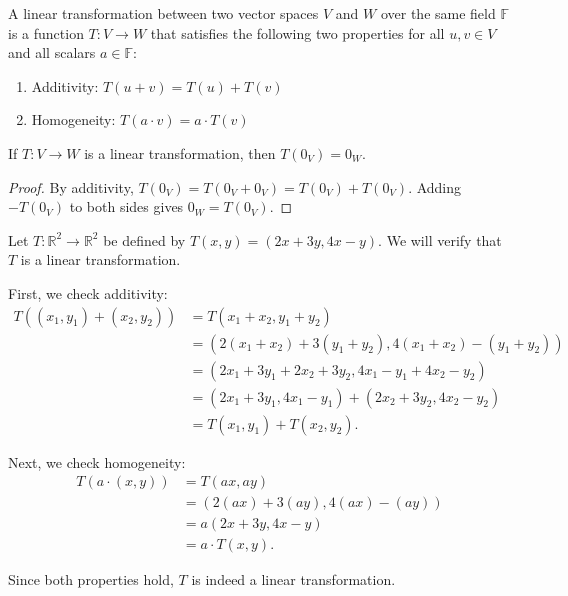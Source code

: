 \begin{definition}
    A linear transformation between two vector spaces $V$ and $W$ over the same field $\mathbb{F}$ is a function $T: V \to W$ that satisfies the following two properties for all $u, v \in V$ and all scalars $a \in \mathbb{F}$:
    \begin{enumerate}
        \item Additivity: $T(u + v) = T(u) + T(v)$
        \item Homogeneity: $T(a \cdot v) = a \cdot T(v)$
    \end{enumerate}
\end{definition}

\begin{lemma}\label{L1-lem:zero}
    If $T: V \to W$ is a linear transformation, then $T(0_V) = 0_W$.
\end{lemma}

\begin{proof}
    By additivity, $T(0_V) = T(0_V + 0_V) = T(0_V) + T(0_V)$. Adding $-T(0_V)$ to both sides gives $0_W = T(0_V)$.
\end{proof}

\begin{example}
    Let $T: \mathbb{R}^2 \to \mathbb{R}^2$ be defined by $T(x, y) = (2x + 3y, 4x - y)$. We will verify that $T$ is a linear transformation.

    First, we check additivity:
    \begin{align*}
        T((x_1, y_1) + (x_2, y_2)) &= T(x_1 + x_2, y_1 + y_2) \\
        &= (2(x_1 + x_2) + 3(y_1 + y_2), 4(x_1 + x_2) - (y_1 + y_2)) \\
        &= (2x_1 + 3y_1 + 2x_2 + 3y_2, 4x_1 - y_1 + 4x_2 - y_2) \\
        &= (2x_1 + 3y_1, 4x_1 - y_1) + (2x_2 + 3y_2, 4x_2 - y_2) \\
        &= T(x_1, y_1) + T(x_2, y_2).
    \end{align*}

    Next, we check homogeneity:
    \begin{align*}
        T(a \cdot (x, y)) &= T(ax, ay) \\
        &= (2(ax) + 3(ay), 4(ax) - (ay)) \\
        &= a(2x + 3y, 4x - y) \\
        &= a \cdot T(x, y).
    \end{align*}

    Since both properties hold, $T$ is indeed a linear transformation.
\end{example}

